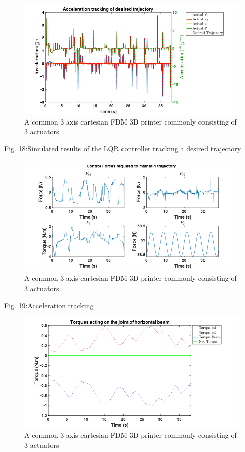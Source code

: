 \documentclass{UoNMCHA}
\numberwithin{equation}{section}
\begin{document}
	\begin{figure}[H]
		\begin{center}
			\includegraphics[width=.8\linewidth]{figs/Picture29}
			\caption{A  common 3 axis cartesian FDM 3D printer commonly consisting of 3 actuators}
			\label{figs/Picture29}
		\end{center}
	\end{figure}
	
	
	Fig. 18:Simulated results of the LQR controller tracking a desired trajectory
	
	\begin{figure}[H]
		\begin{center}
			\includegraphics[width=.8\linewidth]{figs/Picture30}
			\caption{A  common 3 axis cartesian FDM 3D printer commonly consisting of 3 actuators}
			\label{figs/Picture30}
		\end{center}
	\end{figure}
	
	
	Fig. 19:Acceleration tracking 
	
	\begin{figure}[H]
		\begin{center}
			\includegraphics[width=.8\linewidth]{figs/Picture31}
			\caption{A  common 3 axis cartesian FDM 3D printer commonly consisting of 3 actuators}
			\label{figs/Picture31}
		\end{center}
	\end{figure}
	
\end{document}
